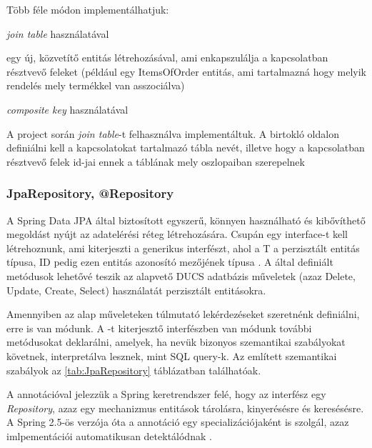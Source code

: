 Több féle módon implementálhatjuk: 

\begin{listing}
	\item \emph{join table} használatával
	\item egy új, közvetítő entitás létrehozásával, ami enkapszulálja a kapcsolatban résztvevő feleket (például egy ItemsOfOrder entitás, ami tartalmazná hogy melyik rendelés mely termékkel van asszociálva)
	\item \emph{composite key} használatával
\end{listing}

A project során \emph{join table}-t felhasználva implementáltuk. A birtokló oldalon definiálni kell a kapcsolatokat tartalmazó tábla nevét, illetve hogy a kapcsolatban résztvevő felek id-jai ennek a táblának mely oszlopaiban szerepelnek \par


\subsubsection{JpaRepository, @Repository}

A Spring Data JPA által biztosított  egyszerű, könnyen használható és kibővíthető megoldást nyújt az adatelérési réteg létrehozására. Csupán egy interface-t kell létrehoznunk, ami kiterjeszti a  generikus interfészt, ahol a T a perzisztált entitás típusa, ID pedig ezen entitás azonosító mezőjének típusa \cite{jpaRepositoryDocumentation}. A  által definiált metódusok lehetővé teszik az alapvető  DUCS adatbázis műveletek (azaz Delete, Update, Create, Select) használatát perzisztált entitásokra. \par

Amennyiben az alap műveleteken túlmutató lekérdezéseket szeretnénk definiálni, erre is van módunk. A -t kiterjesztő interfészben van módunk további metódusokat deklarálni, amelyek, ha nevük bizonyos szemantikai szabályokat követnek, interpretálva lesznek, mint SQL query-k. Az említett szemantikai szabályok az \ref{tab:JpaRepository} táblázatban találhatóak. \par

A  annotációval jelezzük a Spring keretrendszer felé, hogy az interfész egy \emph{Repository}, azaz egy mechanizmus entitások tárolásra, kinyerésésre és keresésésre. A Spring 2.5-ös verzója óta a  annotáció egy specializációjaként is szolgál, azaz imlpementációi automatikusan detektálódnak \cite{repositoryDocumentation}.

